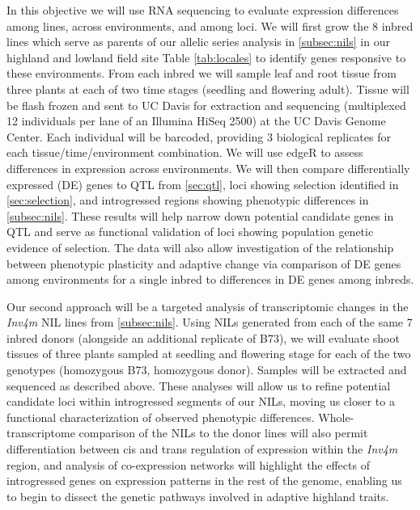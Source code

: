 In this objective we will use RNA sequencing to evaluate expression differences among lines, across environments, and among loci.  We will first grow the 8 inbred lines which serve as parents of our allelic series analysis in \ref{subsec:nils} in our highland and lowland field site Table \ref{tab:locales}  to identify genes responsive to these environments.  From each inbred we will sample leaf and root tissue from three plants at each of two time stages (seedling and flowering adult). Tissue will be flash frozen and sent to UC Davis for extraction and sequencing (multiplexed 12 individuals per lane of an Illumina HiSeq 2500) at the UC Davis Genome Center. Each individual will be barcoded, providing 3 biological replicates for each tissue/time/environment combination. We will use edgeR \citep{robinson2010edger} to assess differences in expression across environments.  We will then compare  differentially expressed (DE) genes to QTL from \ref{sec:qtl}, loci showing selection identified in \ref{sec:selection}, and introgressed regions showing phenotypic differences in \ref{subsec:nils}.   These results will help narrow down potential candidate genes in QTL and serve as functional validation of loci showing population genetic evidence of selection.  The data will also allow investigation of the relationship between phenotypic plasticity and adaptive change \citep[c.f.][]{Rosas26082013} via comparison of DE genes among environments for a single inbred to differences in DE genes among inbreds.  

Our second approach will be a targeted analysis of transcriptomic changes in the \emph{Inv4m} NIL lines from \ref{subsec:nils}.  Using NILs generated from each of the same 7 inbred donors (alongside an additional replicate of B73), we will evaluate shoot tissues of three plants sampled at seedling and flowering stage for each of the two genotypes (homozygous B73, homozygous donor).  Samples will be extracted and sequenced as described above. These analyses will allow us to refine potential candidate loci within introgressed segments of our NILs, moving us closer to a functional characterization of observed phenotypic differences. Whole-transcriptome comparison of the NILs to the donor lines will also permit differentiation between cis and trans regulation of expression within the \emph{Inv4m}  region, and analysis of co-expression networks \citep[c.f.][]{Swanson-Wagner02072012} will highlight the effects of introgressed genes on expression patterns in the rest of the genome, enabling us to begin to dissect the genetic pathways involved in adaptive highland traits.

